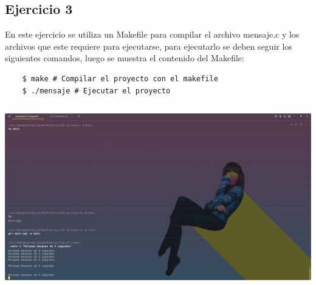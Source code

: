 \documentclass[]{article}
\newenvironment{code}{\captionsetup{type=listing}}{}
\begin{document}
\subsection{Ejercicio 3}
En este ejercicio se utiliza un Makefile para compilar el archivo mensaje.c
y los archivos que este requiere para ejecutarse, para ejecutarlo se deben 
seguir los siguientes comandos, luego se muestra el contenido del Makefile:
\begin{verbatim}
	$ make # Compilar el proyecto con el makefile
	$ ./mensaje # Ejecutar el proyecto
\end{verbatim}

\begin{code}
	\label{code:c-code}
	\inputminted{Makefile}{../E3/Makefile}
\end{code}
		
\includegraphics[scale=0.3,trim={0 0 20cm 20cm},clip]{e2-out.png}  
\end{document}
